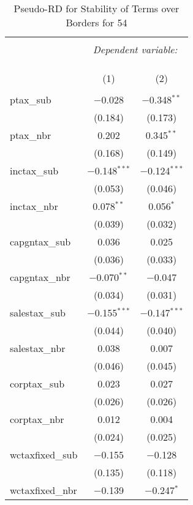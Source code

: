 
\begin{table}[!htbp] \centering 
  \caption{Pseudo-RD for Stability of Terms over Borders for  54} 
  \label{} 
\begin{tabular}{@{\extracolsep{5pt}}lcc} 
\\[-1.8ex]\hline 
\hline \\[-1.8ex] 
 & \multicolumn{2}{c}{\textit{Dependent variable:}} \\ 
\cline{2-3} 
\\[-1.8ex] & \multicolumn{2}{c}{ } \\ 
\\[-1.8ex] & (1) & (2)\\ 
\hline \\[-1.8ex] 
 ptax\_sub & $-$0.028 & $-$0.348$^{**}$ \\ 
  & (0.184) & (0.173) \\ 
  ptax\_nbr & 0.202 & 0.345$^{**}$ \\ 
  & (0.168) & (0.149) \\ 
  inctax\_sub & $-$0.148$^{***}$ & $-$0.124$^{***}$ \\ 
  & (0.053) & (0.046) \\ 
  inctax\_nbr & 0.078$^{**}$ & 0.056$^{*}$ \\ 
  & (0.039) & (0.032) \\ 
  capgntax\_sub & 0.036 & 0.025 \\ 
  & (0.036) & (0.033) \\ 
  capgntax\_nbr & $-$0.070$^{**}$ & $-$0.047 \\ 
  & (0.034) & (0.031) \\ 
  salestax\_sub & $-$0.155$^{***}$ & $-$0.147$^{***}$ \\ 
  & (0.044) & (0.040) \\ 
  salestax\_nbr & 0.038 & 0.007 \\ 
  & (0.046) & (0.045) \\ 
  corptax\_sub & 0.023 & 0.027 \\ 
  & (0.026) & (0.026) \\ 
  corptax\_nbr & 0.012 & 0.004 \\ 
  & (0.024) & (0.025) \\ 
  wctaxfixed\_sub & $-$0.155 & $-$0.128 \\ 
  & (0.135) & (0.118) \\ 
  wctaxfixed\_nbr & $-$0.139 & $-$0.247$^{*}$ \\ 

\end{tabular}
\end{table}
